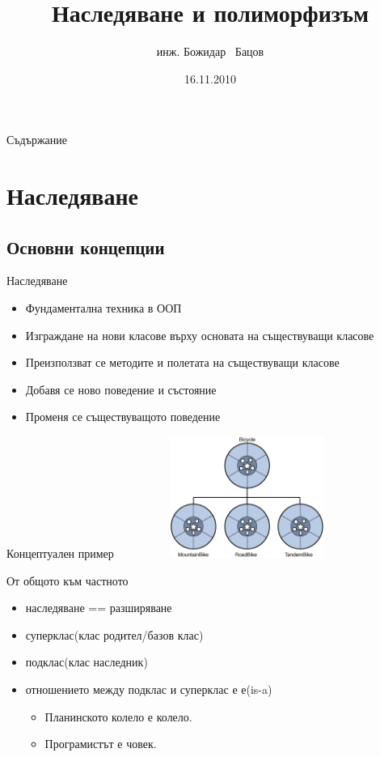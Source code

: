 \documentclass{beamer}
\title{Наследяване и полиморфизъм}
\author{инж. Божидар ~Бацов}
\institute{Drow Ltd.}
\date{16.11.2010}
\begin{document}
\begin{frame}
  \titlepage
\end{frame}

\begin{frame}{Съдържание}
  \transdissolve
  \tableofcontents[pausesections]
\end{frame}

\section{Наследяване}

\subsection{Основни концепции}
\begin{frame}{Наследяване}
  \transdissolve
  \begin{itemize}
  \item Фундаментална техника в ООП \pause
  \item Изграждане на нови класове върху основата на съществуващи
    класове \pause
  \item Преизползват се методите и полетата на съществуващи класове \pause
  \item Добавя се ново поведение и състояние \pause
  \item Променя се съществуващото поведение
  \end{itemize}
\end{frame}

\begin{frame}{Концептуален пример}
  \transdissolve
  \includegraphics[width=320px, height=150px]{images/concepts-inheritance.png}  
\end{frame}

\begin{frame}{От общото към частното}
  \transdissolve
  \begin{itemize}
  \item наследяване == разширяване \pause
  \item суперклас(клас родител/базов клас) \pause
  \item подклас(клас наследник) \pause
  \item отношението между подклас и суперклас е е(is-a)
    \begin{itemize}
      \item Планинското колело е колело.
      \item Програмистът е човек.
    \end{itemize}
  \end{itemize}
\end{frame}
\end{document}
